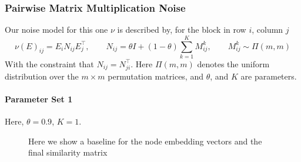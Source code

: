 \documentclass[a4paper]{article}
\begin{document}
\subsubsection*{Pairwise Matrix Multiplication Noise}
Our noise model for this one $\nu$ is described by, for the block in row $i$, column $j$
\begin{equation*}
    \nu(E)_{ij} = E_i N_{ij} E_j^\top, \quad \quad N_{ij} = \theta I + (1-\theta) \sum_{k=1}^K M_{ij}^k , \quad \quad M_{ij}^{k} \sim {\Pi}(m, m)
\end{equation*}
With the constraint that $N_{ij} = N_{ji}^\top$. Here $\Pi(m,m)$ denotes the uniform distribution over the $m \times m$ permutation matrices, and $\theta$, and $K$ are parameters.

\paragraph{Parameter Set 1}
Here, $\theta = 0.9$, $K = 1$.
\begin{figure}[H]
    \centering
    \caption{Here we show a baseline for the node embedding vectors and the final similarity matrix}
    \label{fig:pairwise_plot}
\end{figure}
\end{document}
